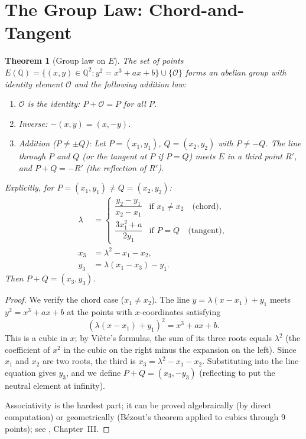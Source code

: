 \documentclass[12pt,a4paper]{amsart}
\newtheorem{theorem}{Theorem}[section]
\theoremstyle{definition}
\newcommand{\Q}{\mathbb{Q}}
\begin{document}
\section{The Group Law: Chord-and-Tangent}

\begin{theorem}[Group law on $E$]
\label{thm:group_law}
The set of points $E(\Q) = \{(x,y) \in \Q^2 : y^2 = x^3 + ax + b\} \cup \{\mathcal{O}\}$
forms an abelian group with identity element $\mathcal{O}$ and
the following addition law:

\begin{enumerate}
  \item[\textup{(i)}] $\mathcal{O}$ is the identity: $P + \mathcal{O} = P$ for all $P$.
  \item[\textup{(ii)}] Inverse: $-(x,y) = (x,-y)$.
  \item[\textup{(iii)}] Addition ($P \ne \pm Q$): Let $P = (x_1,y_1)$,
    $Q = (x_2,y_2)$ with $P \ne -Q$.  The line through $P$ and $Q$
    (or the tangent at $P$ if $P = Q$) meets $E$ in a third point $R'$,
    and $P + Q = -R'$ (the reflection of $R'$).
\end{enumerate}

Explicitly, for $P = (x_1,y_1) \ne Q = (x_2,y_2)$:
\begin{align}
  \lambda &=
  \begin{cases}
    \dfrac{y_2 - y_1}{x_2 - x_1} & \text{if } x_1 \ne x_2 \quad\text{(chord)},\\[6pt]
    \dfrac{3x_1^2 + a}{2y_1}     & \text{if } P = Q \quad\text{(tangent)},
  \end{cases}
  \label{eq:lambda} \\[4pt]
  x_3 &= \lambda^2 - x_1 - x_2, \label{eq:x3} \\
  y_3 &= \lambda(x_1 - x_3) - y_1. \label{eq:y3}
\end{align}
Then $P + Q = (x_3, y_3)$.
\end{theorem}

\begin{proof}
We verify the chord case ($x_1 \ne x_2$).
The line $y = \lambda(x-x_1) + y_1$ meets $y^2 = x^3 + ax + b$
at the points with $x$-coordinates satisfying
\[
  (\lambda(x-x_1)+y_1)^2 = x^3 + ax + b.
\]
This is a cubic in $x$; by Vi\`ete's formulas, the sum of its three roots
equals $\lambda^2$ (the coefficient of $x^2$ in the cubic on the right
minus the expansion on the left).  Since $x_1$ and $x_2$ are two roots,
the third is $x_3 = \lambda^2 - x_1 - x_2$.  Substituting into the line
equation gives $y_3$, and we define $P+Q = (x_3,-y_3)$ (reflecting to
put the neutral element at infinity).

Associativity is the hardest part; it can be proved algebraically
(by direct computation) or geometrically (B\'ezout's theorem applied to
cubics through 9 points); see \cite{Silverman1986}, Chapter~III.
\end{proof}
\end{document}
